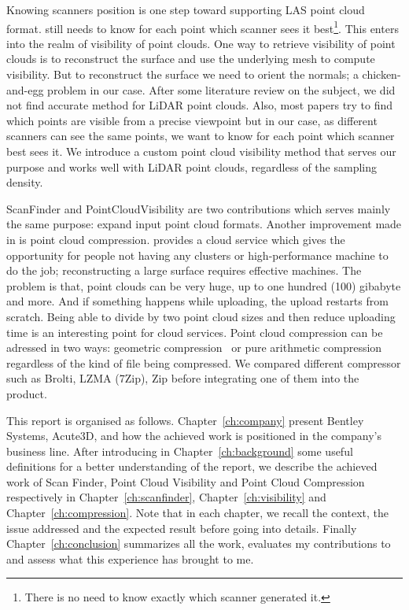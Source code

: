 Knowing scanners position is one step toward supporting LAS point cloud format. \CC still needs to know for each point which scanner sees it best\footnote{There is no need to know exactly which scanner generated it.}. This enters into the realm of visibility of point clouds. One way to retrieve visibility of point clouds is to reconstruct the surface and use the underlying mesh to compute visibility. But to reconstruct the surface we need to orient the normals; a chicken-and-egg problem in our case. After some literature review on the subject, we did not find accurate method for LiDAR point clouds. Also, most papers try to find which points are visible from a precise viewpoint but in our case, as different scanners can see the same points, we want to know for each point which scanner best sees it. We introduce a custom point cloud visibility method that serves our purpose and works well with LiDAR point clouds, regardless of the sampling density.

ScanFinder and PointCloudVisibility are two contributions which serves mainly the same purpose: expand \CC input point cloud formats. Another improvement made in \CC is point cloud compression. \CC provides a cloud service which gives the opportunity for people not having any clusters or high-performance machine to do the job; reconstructing a large surface requires effective machines. The problem is that, point clouds can be very huge, up to one hundred (100) gibabyte and more. And if something happens while uploading, the upload restarts from scratch. Being able to divide by two point cloud sizes and then reduce uploading time is an interesting point for \CC cloud services. Point cloud compression can be adressed in two ways: geometric compression~\cite{compress1, compress2} or pure arithmetic compression regardless of the kind of file being compressed. We compared different compressor such as Brolti, LZMA (7Zip), Zip before integrating one of them into the product.

This report is organised as follows. Chapter~\ref{ch:company} present Bentley Systems, Acute3D, \CC and how the achieved work is positioned in the company's business line. After introducing in Chapter~\ref{ch:background} some useful definitions for a better understanding of the report, we describe the achieved work of Scan Finder, Point Cloud Visibility and Point Cloud Compression respectively in Chapter~\ref{ch:scanfinder}, Chapter~\ref{ch:visibility} and
Chapter~\ref{ch:compression}. Note that in each chapter, we recall the context, the issue addressed and the expected result before going into details. Finally Chapter~\ref{ch:conclusion} summarizes all the work, evaluates my contributions to \CC and assess what this experience has brought to me.
